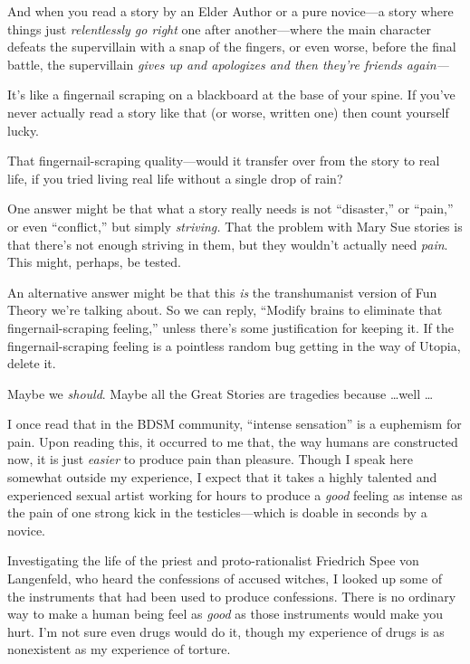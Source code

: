 {
 And when you read a story by an Elder Author or a pure novice---a
story where things just \textit{relentlessly go right} one after
another---where the main character defeats the supervillain with a snap
of the fingers, or even worse, before the final battle, the
supervillain \textit{gives up and apologizes and then
they're friends again---}}

{
 It's like a fingernail scraping on a blackboard at
the base of your spine. If you've never actually read a
story like that (or worse, written one) then count yourself lucky.}

{
 That fingernail-scraping quality---would it transfer over from the
story to real life, if you tried living real life without a single drop
of rain?}

{
 One answer might be that what a story really needs is not
``disaster,'' or
``pain,'' or even
``conflict,'' but simply
\textit{striving.} That the problem with Mary Sue stories is that
there's not enough striving in them, but they
wouldn't actually need \textit{pain}. This might,
perhaps, be tested.}

{
 An alternative answer might be that this \textit{is} the
transhumanist version of Fun Theory we're talking
about. So we can reply, ``Modify brains to eliminate
that fingernail-scraping feeling,'' unless
there's some justification for keeping it. If the
fingernail-scraping feeling is a pointless random bug getting in the
way of Utopia, delete it.}

{
 Maybe we \textit{should}. Maybe all the Great Stories are
tragedies because \ldots well \ldots}

{
 I once read that in the BDSM community, ``intense
sensation'' is a euphemism for pain. Upon reading
this, it occurred to me that, the way humans are constructed now, it is
just \textit{easier} to produce pain than pleasure. Though I speak here
somewhat outside my experience, I expect that it takes a highly
talented and experienced sexual artist working for hours to produce a
\textit{good} feeling as intense as the pain of one strong kick in the
testicles---which is doable in seconds by a novice.}

{
 Investigating the life of the priest and proto-rationalist
Friedrich Spee von Langenfeld, who heard the confessions of accused
witches, I looked up some of the instruments that had been used to
produce confessions. There is no ordinary way to make a human being
feel as \textit{good} as those instruments would make you hurt.
I'm not sure even drugs would do it, though my
experience of drugs is as nonexistent as my experience of torture.}

